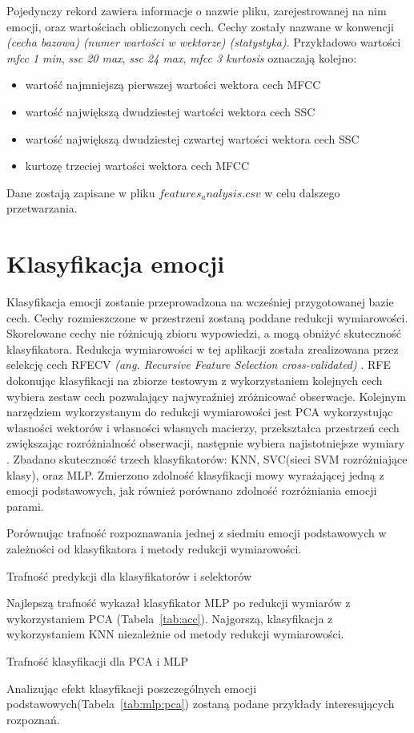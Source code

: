 \documentclass[a4paper,12pt,twoside,openany]{report}
\newcommand{\ang}[1]{\textit{(ang. #1)}}
\newcommand{\Tab}[1]{(Tabela~\ref{#1})}
\begin{document}
Pojedynczy rekord zawiera informacje o nazwie pliku, zarejestrowanej na nim emocji, 
oraz wartościach obliczonych cech.
Cechy zostały nazwane w konwencji \textit{(cecha bazowa) (numer wartości w wektorze) (statystyka)}.
Przykładowo wartości \textit{mfcc 1 min}, \textit{ssc 20 max}, \textit{ssc 24 max}, \textit{mfcc 3 kurtosis} oznaczają kolejno:
\begin{itemize}
\item wartość najmniejszą pierwszej wartości wektora cech MFCC
\item wartość największą dwudziestej wartości wektora cech SSC
\item wartość największą dwudziestej czwartej wartości wektora cech SSC
\item kurtozę trzeciej wartości wektora cech MFCC
\end{itemize}
Dane zostają zapisane w pliku $features_analysis.csv$ w celu dalszego przetwarzania.
\section{Klasyfikacja emocji}
Klasyfikacja emocji zostanie przeprowadzona na wcześniej przygotowanej bazie cech.
Cechy rozmieszczone w przestrzeni zostaną poddane redukcji wymiarowości. 
Skorelowane cechy nie różnicują zbioru wypowiedzi, a mogą obniżyć skuteczność klasyfikatora.
Redukcja wymiarowości w tej aplikacji została zrealizowana przez selekcję cech RFECV \ang{Recursive Feature Selection cross-validated} \cite{Guyon2002}.
RFE dokonując klasyfikacji na zbiorze testowym z wykorzystaniem kolejnych cech wybiera zestaw cech pozwalający najwyraźniej zróżnicować obserwacje.
Kolejnym narzędziem wykorzystanym do redukcji wymiarowości jest PCA wykorzystując własności wektorów i własności własnych macierzy,
przekształca przestrzeń cech zwiększając rozróżnialność obserwacji, następnie wybiera najistotniejsze wymiary \cite{Bro2014}.
Zbadano skuteczność trzech klasyfikatorów: KNN, SVC(sieci SVM rozróżniające klasy), oraz MLP.
Zmierzono zdolność klasyfikacji mowy wyrażającej jedną z emocji podstawowych, jak również porównano zdolność rozróżniania emocji parami.

Porównując trafność rozpoznawania jednej z siedmiu emocji podstawowych w zależności od klasyfikatora i metody redukcji wymiarowości.
\begin{table}[hc!]
	\centering
	
	\caption{Trafność predykcji dla klasyfikatorów i selektorów}
	\label{tab:acc}
\end{table}
Najlepszą trafność wykazał klasyfikator MLP po redukcji wymiarów z wykorzystaniem PCA \Tab{tab:acc}. 
Najgorszą, klasyfikacja z wykorzystaniem KNN niezależnie od metody redukcji wymiarowości.
\begin{table}[hc!]
	\centering
	
	\caption{Trafność klasyfikacji dla PCA i MLP}
	\label{tab:mlp:pca}
\end{table}
Analizując efekt klasyfikacji poszczególnych emocji podstawowych\Tab{tab:mlp:pca} zostaną podane przykłady interesujących rozpoznań.
\end{document}
